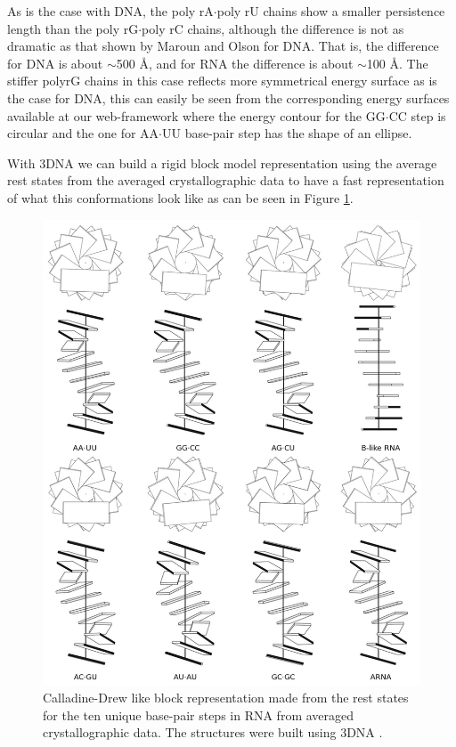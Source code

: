 As  is the  case with  DNA, the  poly rA$\cdot$poly  rU chains  show a
smaller  persistence length  than  the poly  rG$\cdot$poly rC  chains,
although the difference is not as dramatic as that shown by Maroun and
Olson \cite{maroun1988a} for  DNA. That is, the difference  for DNA is
about $\sim$500  \AA, and  for RNA the  difference is  about $\sim$100
\AA.  The stiffer polyrG chains in this case reflects more symmetrical
energy surface  as is the case for  DNA, this can easily  be seen from
the corresponding energy surfaces available at our web-framework where
the energy  contour for the GG$\cdot$CC  step is circular  and the one
for AA$\cdot$UU base-pair step has the shape of an ellipse.

With 3DNA  we can build a  rigid block model  representation using the
average rest states from the  averaged crystallographic data to have a
fast representation  of what  this conformations look  like as  can be
seen in Figure \ref{fig:homohetero}.

\begin{figure}
\centering
\includegraphics[angle=0, scale=3.0]{Chapter4/homohetero.png}
\caption{Calladine-Drew like block representation \cite{calladine1997}
  made from the rest states for  the ten unique base-pair steps in RNA
  from averaged crystallographic data. The structures were built using
  3DNA \cite{lu2003}.}
\label{fig:homohetero}
\end{figure}

